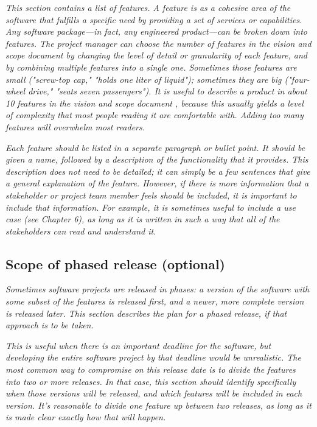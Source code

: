 \documentclass[11pt]{article}
\begin{document}
    \textit{This section contains a list of features. A feature is as a
    cohesive area of the software that fulfills a specific need by
    providing a set of services or capabilities. Any software
    package---in fact, any engineered product---can be broken down
    into features. The project manager can choose the number of
    features in the vision and scope document by changing the level of
    detail or granularity of each feature, and by combining multiple
    features into a single one. Sometimes those features are small
    ("screw-top cap," "holds one liter of liquid"); sometimes they are
    big ("four-wheel drive," "seats seven passengers"). It is useful
    to describe a product in about 10 features in the vision and scope
    document , because this usually yields a level of complexity that
    most people reading it are comfortable with. Adding too many
    features will overwhelm most readers.}

    \textit{Each feature should be listed in a separate paragraph or bullet
    point. It should be given a name, followed by a description of the
    functionality that it provides. This description does not need to
    be detailed; it can simply be a few sentences that give a general
    explanation of the feature. However, if there is more information
    that a stakeholder or project team member feels should be
    included, it is important to include that information. For
    example, it is sometimes useful to include a use case (see Chapter
    6), as long as it is written in such a way that all of the
    stakeholders can read and understand it.}

\subsection{Scope of phased release (optional)}

    \textit{Sometimes software projects are released in phases: a version of
    the software with some subset of the features is released first,
    and a newer, more complete version is released later. This section
    describes the plan for a phased release, if that approach is to be
    taken.}

    \textit{This is useful when there is an important deadline for the
    software, but developing the entire software project by that
    deadline would be unrealistic. The most common way to compromise
    on this release date is to divide the features into two or more
    releases. In that case, this section should identify specifically
    when those versions will be released, and which features will be
    included in each version. It's reasonable to divide one feature up
    between two releases, as long as it is made clear exactly how that
    will happen.}
\end{document}
